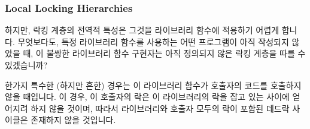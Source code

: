 \subsubsection{Local Locking Hierarchies}
\label{sec:locking:Local Locking Hierarchies}

하지만, 락킹 계층의 전역적 특성은 그것을 라이브러리 함수에 적용하기 어렵게
합니다.
무엇보다도, 특정 라이브러리 함수를 사용하는 어떤 프로그램이 아직 작성되지
않았을 때, 이 불쌍한 라이브러리 함수 구현자는 아직 정의되지 않은 락킹 계층을
따를 수 있겠습니까?

한가지 특수한 (하지만 흔한) 경우는 이 라이브러리 함수가 호출자의 코드를
호출하지 않을 때입니다.
이 경우, 이 호출자의 락은 이 라이브러리의 락을 잡고 있는 사이에 얻어지려 하지
않을 것이며, 따라서 라이브러리와 호출자 모두의 락이 포함된 데드락 사이클은
존재하지 않을 것입니다.

